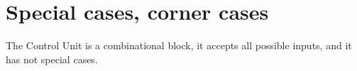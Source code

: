 \section{Special cases, corner cases}

The Control Unit is a combinational block, it accepts all possible inputs, and it has not special cases.
